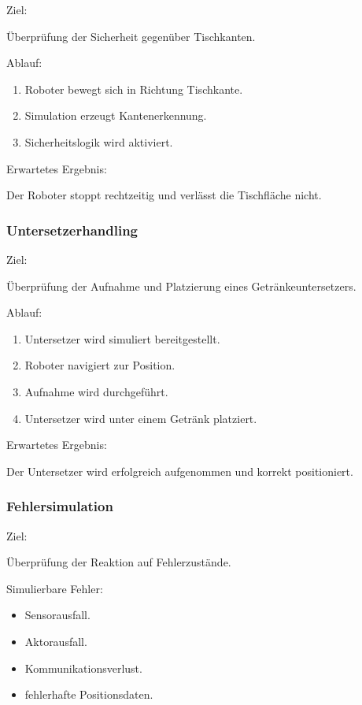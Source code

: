 Ziel:

Überprüfung der Sicherheit gegenüber Tischkanten.

Ablauf:

\begin{enumerate}
\def\labelenumi{\arabic{enumi}.}
\tightlist
\item
  Roboter bewegt sich in Richtung Tischkante.
\item
  Simulation erzeugt Kantenerkennung.
\item
  Sicherheitslogik wird aktiviert.
\end{enumerate}

Erwartetes Ergebnis:

Der Roboter stoppt rechtzeitig und verlässt die Tischfläche nicht.

\subsubsection{Untersetzerhandling}\label{untersetzerhandling-2}

Ziel:

Überprüfung der Aufnahme und Platzierung eines Getränkeuntersetzers.

Ablauf:

\begin{enumerate}
\def\labelenumi{\arabic{enumi}.}
\tightlist
\item
  Untersetzer wird simuliert bereitgestellt.
\item
  Roboter navigiert zur Position.
\item
  Aufnahme wird durchgeführt.
\item
  Untersetzer wird unter einem Getränk platziert.
\end{enumerate}

Erwartetes Ergebnis:

Der Untersetzer wird erfolgreich aufgenommen und korrekt positioniert.

\subsubsection{Fehlersimulation}\label{fehlersimulation}

Ziel:

Überprüfung der Reaktion auf Fehlerzustände.

Simulierbare Fehler:

\begin{itemize}
\tightlist
\item
  Sensorausfall.
\item
  Aktorausfall.
\item
  Kommunikationsverlust.
\item
  fehlerhafte Positionsdaten.
\end{itemize}

